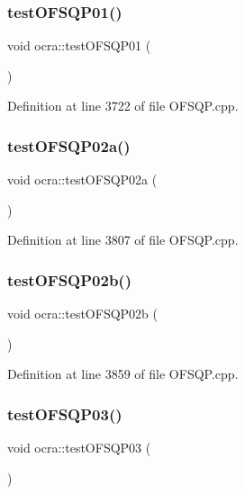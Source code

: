 \subsubsection{\texorpdfstring{test\+O\+F\+S\+Q\+P01()}{testOFSQP01()}}
{\footnotesize\ttfamily void ocra\+::test\+O\+F\+S\+Q\+P01 (\begin{DoxyParamCaption}{ }\end{DoxyParamCaption})}



Definition at line 3722 of file O\+F\+S\+Q\+P.\+cpp.

\hypertarget{namespaceocra_ac330f83952c8acdf4b4cb7dfcd513fc9}{}\label{namespaceocra_ac330f83952c8acdf4b4cb7dfcd513fc9} 
\subsubsection{\texorpdfstring{test\+O\+F\+S\+Q\+P02a()}{testOFSQP02a()}}
{\footnotesize\ttfamily void ocra\+::test\+O\+F\+S\+Q\+P02a (\begin{DoxyParamCaption}{ }\end{DoxyParamCaption})}



Definition at line 3807 of file O\+F\+S\+Q\+P.\+cpp.

\hypertarget{namespaceocra_a0f2585280436d8951c1eccbf804525ca}{}\label{namespaceocra_a0f2585280436d8951c1eccbf804525ca} 
\subsubsection{\texorpdfstring{test\+O\+F\+S\+Q\+P02b()}{testOFSQP02b()}}
{\footnotesize\ttfamily void ocra\+::test\+O\+F\+S\+Q\+P02b (\begin{DoxyParamCaption}{ }\end{DoxyParamCaption})}



Definition at line 3859 of file O\+F\+S\+Q\+P.\+cpp.

\hypertarget{namespaceocra_a45bb08ad25674ac024effc1b52494538}{}\label{namespaceocra_a45bb08ad25674ac024effc1b52494538} 
\subsubsection{\texorpdfstring{test\+O\+F\+S\+Q\+P03()}{testOFSQP03()}}
{\footnotesize\ttfamily void ocra\+::test\+O\+F\+S\+Q\+P03 (\begin{DoxyParamCaption}{ }\end{DoxyParamCaption})}



